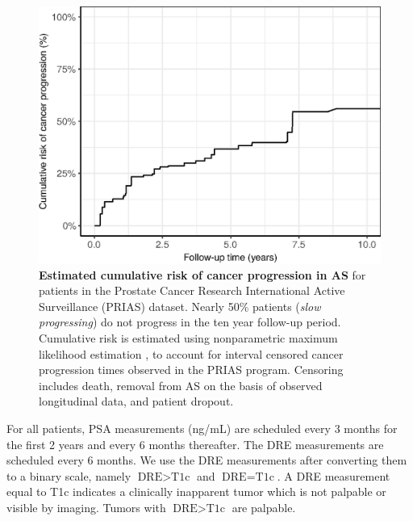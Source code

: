 \begin{figure}[!htb]
\captionsetup{justification=justified}
\centerline{\includegraphics[width=\columnwidth]{images/npmle_plot.eps}}
\caption{\textbf{Estimated cumulative risk of cancer progression in AS} for patients in the Prostate Cancer Research International Active Surveillance (PRIAS) dataset. Nearly 50\% patients (\textit{slow progressing}) do not progress in the ten year follow-up period. Cumulative risk is estimated using nonparametric maximum likelihood estimation \citep{turnbull1976empirical}, to account for interval censored cancer progression times observed in the PRIAS program. Censoring includes death, removal from AS on the basis of observed longitudinal data, and patient dropout.}
\label{fig:npmle_plot}
\end{figure}

For all patients, PSA measurements (ng/mL) are scheduled every 3 months for the first 2 years and every 6 months thereafter. The DRE measurements are scheduled every 6 months. We use the DRE measurements after converting them to a binary scale, namely $\mbox{DRE} > \mbox{T1c}$ and $\mbox{DRE} = \mbox{T1c}$. A DRE measurement equal to T1c\cite{schroder1992tnm} indicates a clinically inapparent tumor which is not palpable or visible by imaging. Tumors with $\mbox{DRE} > \mbox{T1c}$ are palpable.




